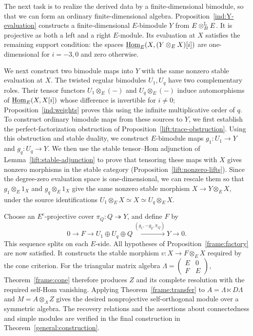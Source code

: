 \documentclass[11pt]{article}
\begin{document}
The next task is to realize the derived data by a finite-dimensional
bimodule, so that we can form an ordinary finite-dimensional algebra.
Proposition~\ref{ind:Y-evaluation} constructs a finite-dimensional
$E$-bimodule $Y$ from $E\otimes^{\rm\mathbb L}_BE$. It is projective as both a left
and a right $E$-module. Its evaluation at $X$ satisfies the remaining
support condition: the spaces
$\underline{{\rm Hom}}_E(X,(Y\otimes_E X)[i])$ are one-dimensional for
$i=-3,0$ and zero otherwise.

We next construct two bimodule maps into $Y$ with the same nonzero
stable evaluation at $X$. The twisted regular bimodules
$U_1,U_q$ have two complementary roles. Their tensor functors
$U_1\otimes_E(-)$ and $U_q\otimes_E(-)$ induce automorphisms of
$\underline{{\rm Hom}}_E(X,X[i])$ whose difference is invertible for
$i\ne0$; Proposition~\ref{ind:weights} proves this using the infinite
multiplicative order of $q$. To construct ordinary bimodule maps from
these sources to $Y$, we first establish the perfect-factorization
obstruction of Proposition~\ref{lift:trace-obstruction}.
Using this obstruction and stable duality, we construct $E$-bimodule
maps $g_1:U_1\to Y$ and $g_q:U_q\to Y$.
We then use the stable tensor--Hom adjunction of
Lemma~\ref{lift:stable-adjunction} to prove that tensoring these maps
with $X$ gives nonzero morphisms in the stable category
(Proposition~\ref{lift:nonzero-lifts}). Since the degree-zero evaluation
space is one-dimensional, we can rescale them so that
$g_1\otimes_E1_X$ and $g_q\otimes_E1_X$ give the same nonzero
stable morphism $X\to Y\otimes_E X$, under the source identifications
$U_1\otimes_E X\simeq X\simeq U_q\otimes_E X$.

Choose an $E^e$-projective cover $\pi_Q:Q\twoheadrightarrow Y$,
and define $F$ by
\[
 0\longrightarrow F\longrightarrow U_1\oplus U_q\oplus Q
 \xrightarrow{(g_1,-g_q,\pi_Q)}Y\longrightarrow0.
\]
This sequence splits on each $E$-side. All hypotheses of
Proposition~\ref{frame:factory} are now
satisfied. It constructs the stable morphism $v:X\to F\otimes_E X$
required by the cone criterion. For the triangular matrix algebra
$\Lambda=\left(\begin{smallmatrix}E&0\\F&E\end{smallmatrix}\right)$,
Theorem~\ref{frame:cone} therefore produces $Z$ and its complete
resolution with the required self-Hom vanishing. Applying
Theorem~\ref{frame:transfer} to $A=\Lambda\ltimes D\Lambda$ and
$M=A\otimes_\Lambda Z$ gives the desired nonprojective self-orthogonal
module over a symmetric algebra. The recovery relations and the
assertions about connectedness and simple modules are verified in
the final construction in Theorem~\ref{general:construction}.
\end{document}
